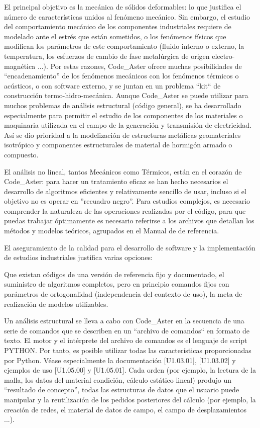 \documentclass[12pt]{book}
\theoremstyle{definition}
\theoremstyle{remark}
\theoremstyle{plain}
\begin{document}
El principal objetivo es la mecánica de sólidos deformables: lo que justifica 
el número de características unidos al fenómeno mecánico. Sin embargo, el estudio 
del comportamiento mecánico de los componentes industriales requiere de modelado
 ante el estrés que están sometidos, o los fenómenos físicos que modifican 
los parámetros de este comportamiento (fluido interno o externo, la temperatura, 
los esfuerzos de cambio de fase metalúrgica de origen electro-magnética ...). Por 
estas razones, Code\_Aster ofrece muchas posibilidades de ``encadenamiento'' de los 
fenómenos mecánicos con los fenómenos térmicos o acústicos, o con software externo,
 y se juntan en un problema ``kit`` de construcción termo-hidro-mecánica. Aunque 
Code\_Aster se puede utilizar para muchos problemas de análisis estructural 
(código general), se ha desarrollado especialmente para permitir el estudio de 
los componentes de los materiales o maquinaria utilizada en el campo de la 
generación y transmisión de electricidad. Así se dio prioridad a la modelización 
de estructuras metálicas geomateriales isotrópico y componentes estructurales de 
material de hormigón armado o compuesto.

El análisis no lineal, tantos Mecánicos como Térmicos, están en el corazón de 
Code\_Aster: para hacer un tratamiento eficaz se han hecho necesarios el 
desarrollo de algoritmos eficientes y relativamente sencillo de usar, incluso 
si el objetivo no es operar en ''recuadro negro''. Para estudios complejos, es 
necesario comprender la 
naturaleza de las operaciones realizadas por el código, para que puedas trabajar
 óptimamente es necesario referirse a los archivos que detallan los métodos y
 modelos teóricos, agrupados en el Manual de de referencia.

El aseguramiento de la calidad para el desarrollo de software y la implementación 
de estudios industriales justifica varias opciones:

Que existan códigos de una versión de referencia fijo y documentado, el suministro
 de algoritmos completos, pero en principio comandos fijos con parámetros de 
ortogonalidad (independencia del contexto de uso), la meta de realización de 
modelos utilizables.

Un análisis estructural se lleva a cabo con Code\_Aster en la secuencia de una 
serie de comandos que se describen en un ``archivo de comandos`` en formato de 
texto. El motor y el intérprete del archivo de comandos es el lenguaje de script
 PYTHON. Por tanto, es posible utilizar todas las características proporcionadas 
por Python. Véase especialmente la documentación [U1.03.01], [U1.03.02] y ejemplos
 de uso [U1.05.00] y [U1.05.01]. Cada orden (por ejemplo, la lectura de la malla, 
los datos del material condición, cálculo estático lineal) produjo un ``resultado 
de concepto'', todas las estructuras de datos que el usuario puede manipular y la 
reutilización de los pedidos posteriores del cálculo (por ejemplo, la creación 
de redes, el material de datos de campo, el campo de desplazamientos ...).
\end{document}
